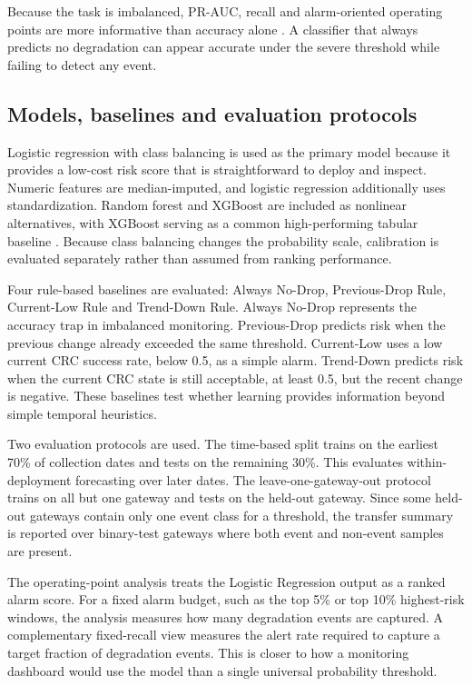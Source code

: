 \documentclass{jot}
\begin{document}
Because the task is imbalanced, PR-AUC, recall and alarm-oriented operating points are more informative than accuracy alone \cite{19}. A classifier that always predicts no degradation can appear accurate under the severe threshold while failing to detect any event.

\subsection{Models, baselines and evaluation protocols}\label{s:3.4}
Logistic regression with class balancing is used as the primary model because it provides a low-cost risk score that is straightforward to deploy and inspect. Numeric features are median-imputed, and logistic regression additionally uses standardization. Random forest and XGBoost are included as nonlinear alternatives, with XGBoost serving as a common high-performing tabular baseline \cite{18}. Because class balancing changes the probability scale, calibration is evaluated separately rather than assumed from ranking performance.

Four rule-based baselines are evaluated: Always No-Drop, Previous-Drop Rule, Current-Low Rule and Trend-Down Rule. Always No-Drop represents the accuracy trap in imbalanced monitoring. Previous-Drop predicts risk when the previous change already exceeded the same threshold. Current-Low uses a low current CRC success rate, below 0.5, as a simple alarm. Trend-Down predicts risk when the current CRC state is still acceptable, at least 0.5, but the recent change is negative. These baselines test whether learning provides information beyond simple temporal heuristics.

Two evaluation protocols are used. The time-based split trains on the earliest 70\% of collection dates and tests on the remaining 30\%. This evaluates within-deployment forecasting over later dates. The leave-one-gateway-out protocol trains on all but one gateway and tests on the held-out gateway. Since some held-out gateways contain only one event class for a threshold, the transfer summary is reported over binary-test gateways where both event and non-event samples are present.

The operating-point analysis treats the Logistic Regression output as a ranked alarm score. For a fixed alarm budget, such as the top 5\% or top 10\% highest-risk windows, the analysis measures how many degradation events are captured. A complementary fixed-recall view measures the alert rate required to capture a target fraction of degradation events. This is closer to how a monitoring dashboard would use the model than a single universal probability threshold.
\end{document}
